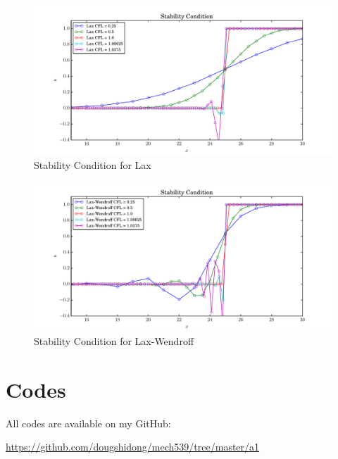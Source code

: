 \documentclass[letterpaper,12pt,]{article}
\begin{document}
\begin{figure}[h]
    \centering
    \includegraphics[width = \textwidth]{./Figures/q4_1}
    \caption{Stability Condition for Lax}
    \label{fig:q4}
\end{figure}


\begin{figure}[h]
    \centering
    \includegraphics[width = \textwidth]{./Figures/q4_2}
    \caption{Stability Condition for Lax-Wendroff}
    \label{fig:q4}
\end{figure}





\section*{Codes}

All codes are available on my GitHub:

\url{https://github.com/dougshidong/mech539/tree/master/a1}
\end{document}
